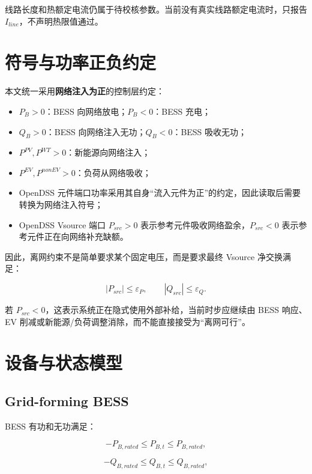 \documentclass[UTF8,a4paper,11pt]{ctexart}
\begin{document}
线路长度和热额定电流仍属于待校核参数。当前没有真实线路额定电流时，只报告 $I_{line}$，不声明热限值通过。

\section{符号与功率正负约定}

本文统一采用\textbf{网络注入为正}的控制层约定：

\begin{itemize}
  \item $P_B>0$：BESS 向网络放电；$P_B<0$：BESS 充电；
  \item $Q_B>0$：BESS 向网络注入无功；$Q_B<0$：BESS 吸收无功；
  \item $P^{PV},P^{WT}>0$：新能源向网络注入；
  \item $P^{EV},P^{nonEV}>0$：负荷从网络吸收；
  \item OpenDSS 元件端口功率采用其自身“流入元件为正”的约定，因此读取后需要转换为网络注入符号；
  \item OpenDSS Vsource 端口 $P_{src}>0$ 表示参考元件吸收网络盈余，$P_{src}<0$ 表示参考元件正在向网络补充缺额。
\end{itemize}

因此，离网约束不是简单要求某个固定电压，而是要求最终 Vsource 净交换满足：

\begin{equation}
|P_{src}|\leq\varepsilon_P,
\qquad |Q_{src}|\leq\varepsilon_Q.
\end{equation}

若 $P_{src}<0$，这表示系统正在隐式使用外部补给，当前时步应继续由 BESS 响应、EV 削减或新能源/负荷调整消除，而不能直接接受为“离网可行”。

\section{设备与状态模型}

\subsection{Grid-forming BESS}

BESS 有功和无功满足：

\begin{equation}
-P_{B,rated}\leq P_{B,t}\leq P_{B,rated},
\end{equation}

\begin{equation}
-Q_{B,rated}\leq Q_{B,t}\leq Q_{B,rated},
\end{equation}
\end{document}
